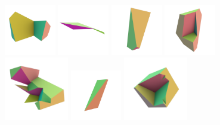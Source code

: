 \documentclass[11pt, oneside]{amsart}   	%
\begin{document}
\begin{figure}[htbp]
   \includegraphics[width=0.20\textwidth]{images/0014.png}%
   \includegraphics[width=0.20\textwidth]{images/0015.png}\hspace{-9mm}%
   \includegraphics[width=0.20\textwidth]{images/0016.png}%
\vspace{-10mm}      
   \includegraphics[width=0.20\textwidth]{images/0017.png}%
   \includegraphics[width=0.25\textwidth]{images/0019.png}\hspace{-7mm}%
   \includegraphics[width=0.20\textwidth]{images/0020.png}\hspace{-7mm}%
   \includegraphics[width=0.25\textwidth]{images/0021.png}\hspace{-7mm}%

\end{figure}
\end{document}
